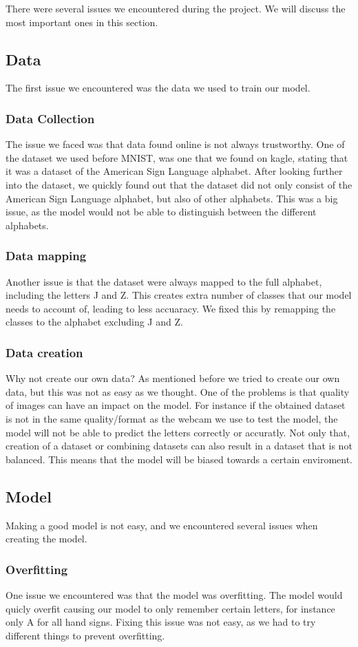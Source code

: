 \documentclass[../paper.tex]{subfiles}
\begin{document}
There were several issues we encountered during the project. 
We will discuss the most important ones in this section.
\subsection{Data}
The first issue we encountered was the data we used to train our model.
\subsubsection{Data Collection}
The issue we faced was that data found online is not always trustworthy.
One of the dataset we used before MNIST, was one that we found on kagle, stating that it was a dataset of the American Sign Language alphabet.
After looking further into the dataset, we quickly found out that the dataset did not only consist of the American Sign Language alphabet, but also of other alphabets.
This was a big issue, as the model would not be able to distinguish between the different alphabets.
\subsubsection{Data mapping}
Another issue is that the dataset were always mapped to the full alphabet, including the letters J and Z.
This creates extra number of classes that our model needs to account of, leading to less accuaracy.
We fixed this by remapping the classes to the alphabet excluding J and Z.
\subsubsection{Data creation}
Why not create our own data? As mentioned before we tried to create our own data, but this was not as easy as we thought.
One of the problems is that quality of images can have an impact on the model. 
For instance if the obtained dataset is not in the same quality/format as the webcam we use to test the model, the model will not be able to predict the letters correctly or accuratly.
Not only that, creation of a dataset or combining datasets can also result in a dataset that is not balanced.
This means that the model will be biased towards a certain enviroment.
\subsection{Model}
Making a good model is not easy, and we encountered several issues when creating the model.
\subsubsection{Overfitting}
One issue we encountered was that the model was overfitting. 
The model would quicly overfit causing our model to only remember certain letters, for instance only A for all hand signs.
Fixing this issue was not easy, as we had to try different things to prevent overfitting.
\end{document}
